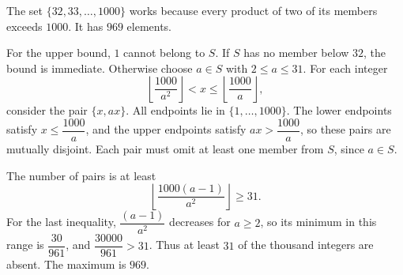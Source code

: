 The set $\{32,33,\ldots,1000\}$ works because every product of two of its members exceeds $1000$. It has $969$ elements.

For the upper bound, $1$ cannot belong to $S$. If $S$ has no member below $32$, the bound is immediate. Otherwise choose $a\in S$ with $2\le a\le31$. For each integer
\[
\left\lfloor\dfrac{1000}{a^2}\right\rfloor<x\le
\left\lfloor\dfrac{1000}{a}\right\rfloor,
\]
consider the pair $\{x,ax\}$. All endpoints lie in $\{1,\ldots,1000\}$. The lower endpoints satisfy $x\le\dfrac{1000}{a}$, and the upper endpoints satisfy $ax>\dfrac{1000}{a}$, so these pairs are mutually disjoint. Each pair must omit at least one member from $S$, since $a\in S$.

The number of pairs is at least
\[
\left\lfloor\dfrac{1000(a-1)}{a^2}\right\rfloor\ge31.
\]
For the last inequality, $\dfrac{(a-1)}{a^2}$ decreases for $a\ge2$, so its minimum in this range is $\dfrac{30}{961}$, and $\dfrac{30000}{961}>31$. Thus at least $31$ of the thousand integers are absent. The maximum is $\boxed{969}$.
